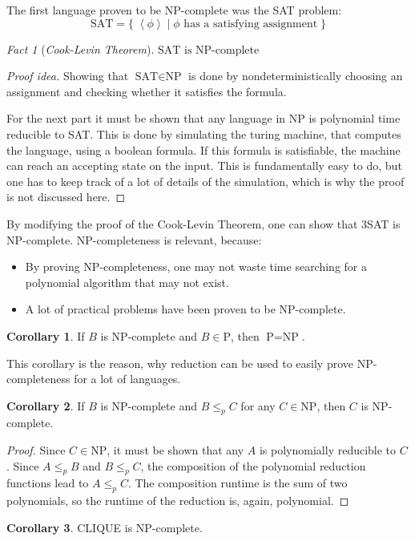 \documentclass[10pt,fleqn]{article}
\theoremstyle{definition}
\newtheorem{corollary}{Corollary}
\theoremstyle{remark}
\newtheorem{fact}{Fact}
\newcommand{\pclass}{\text{P}}
\newcommand{\npclass}{\text{NP}}
\newcommand{\satprob}{\text{SAT}}
\newcommand{\lpp}{\left \langle}
\newcommand{\rpp}{\right \rangle}
\newcommand{\enc}[1]{\lpp #1 \rpp}
\renewcommand{\qedsymbol}{\(\blacksquare\)}
\begin{document}
The first language proven to be NP-complete was the SAT problem:
\[
    \satprob = \{ \;\enc{\phi} \mid \phi \text{ has a satisfying assignment} \; \}
\]
\begin{fact}[\emph{Cook-Levin Theorem}]
    \(\satprob \text{ is NP-complete}\)
\end{fact}
\begin{proof}[Proof idea] Showing that \(\satprob \in \npclass\) is done by nondeterministically choosing an assignment and checking whether it satisfies the formula.

    For the next part it must be shown that any language in NP is polynomial time reducible to SAT. This is done by simulating the turing machine, that computes the language, using a boolean formula. If this formula is satisfiable, the machine can reach an accepting state on the input. This is fundamentally easy to do, but one has to keep track of a lot of details of the simulation, which is why the proof is not discussed here.
    \renewcommand{\qedsymbol}{}
\end{proof}

By modifying the proof of the Cook-Levin Theorem, one can show that 3SAT is NP-complete. NP-completeness is relevant, because:
\begin{itemize}

    \item By proving NP-completeness, one may not waste time searching for a polynomial algorithm that may not exist.

    \item A lot of practical problems have been proven to be NP-complete.

\end{itemize}

\begin{corollary}
    If \(B\) is NP-complete and \(B \in \pclass\), then \(\pclass=\npclass\).
\end{corollary}
This corollary is the reason, why reduction can be used to easily prove NP-completeness for a lot of languages. 
\begin{corollary}
    If \(B\) is NP-complete and \(B \leq_p C\) for any \(C \in \npclass\), then \(C\) is NP-complete.
\end{corollary}
\begin{proof}
    Since \(C \in \npclass\), it must be shown that any \(A\) is polynomially reducible to \(C\). Since \(A \leq_p B\) and \(B \leq_p C\), the composition of the polynomial reduction functions lead to \(A \leq_p C\). The composition runtime is the sum of two polynomials, so the runtime of the reduction is, again, polynomial.
\end{proof}
\begin{corollary}
    CLIQUE is NP-complete.
\end{corollary}
\end{document}
